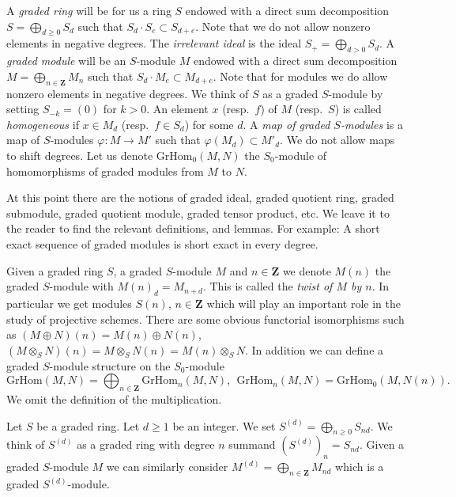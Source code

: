 \noindent
A {\it graded ring} will be for us a ring $S$ endowed
with a direct sum decomposition $S = \bigoplus_{d \geq 0} S_d$
such that $S_d \cdot S_e \subset S_{d+e}$.
Note that we do not allow nonzero elements in negative degrees.
The {\it irrelevant ideal} is the ideal $S_{+} = \bigoplus_{d > 0} S_d$.
A {\it graded module}
will be an $S$-module $M$ endowed with a direct sum decomposition
$M = \bigoplus_{n\in \mathbf{Z}} M_n$ such that $S_d \cdot M_e
\subset M_{d+e}$. Note that for modules we do allow
nonzero elements in negative degrees.
We think of $S$ as a graded $S$-module by setting $S_{-k} = (0)$
for $k > 0$. An element $x$ (resp.\ $f$) of $M$ (resp.\ $S$) is called
{\it homogeneous}
if $x \in M_d$ (resp.\ $f \in S_d$) for some $d$.
A {\it map of graded $S$-modules} is a map of $S$-modules
$\varphi : M \to M'$ such that $\varphi(M_d) \subset M'_d$.
We do not allow maps to shift degrees. Let us denote
$\text{GrHom}_0(M, N)$ the $S_0$-module of homomorphisms
of graded modules from $M$ to $N$.

\medskip\noindent
At this point there are the notions of graded ideal,
graded quotient ring, graded submodule, graded quotient module,
graded tensor product, etc. We leave it to the reader to find the
relevant definitions, and lemmas. For example: A short exact sequence
of graded modules is short exact in every degree.

\medskip\noindent
Given a graded ring $S$, a graded $S$-module $M$ and $n \in \mathbf{Z}$
we denote $M(n)$ the graded $S$-module with $M(n)_d = M_{n + d}$.
This is called the {\it twist of $M$ by $n$}. In particular we get
modules $S(n)$, $n \in \mathbf{Z}$ which will play an important
role in the study of projective schemes. There are some obvious
functorial isomorphisms such as
$(M \oplus N)(n) = M(n) \oplus N(n)$,
$(M \otimes_S N)(n) = M \otimes_S N(n) = M(n) \otimes_S N$.
In addition we can define a graded $S$-module structure on
the $S_0$-module
$$
\text{GrHom}(M, N) = 
\bigoplus\nolimits_{n \in \mathbf{Z}} \text{GrHom}_n(M, N),\ \ 
\text{GrHom}_n(M, N) = \text{GrHom}_0(M, N(n)).
$$
We omit the definition of the multiplication.

\medskip\noindent
Let $S$ be a graded ring. Let $d \geq 1$ be an integer.
We set $S^{(d)} = \bigoplus_{n \geq 0} S_{nd}$. We think of
$S^{(d)}$ as a graded ring with degree $n$ summand 
$(S^{(d)})_n = S_{nd}$. Given a graded $S$-module $M$ we
can similarly consider $M^{(d)} = \bigoplus_{n \in \mathbf{Z}} M_{nd}$
which is a graded $S^{(d)}$-module.









